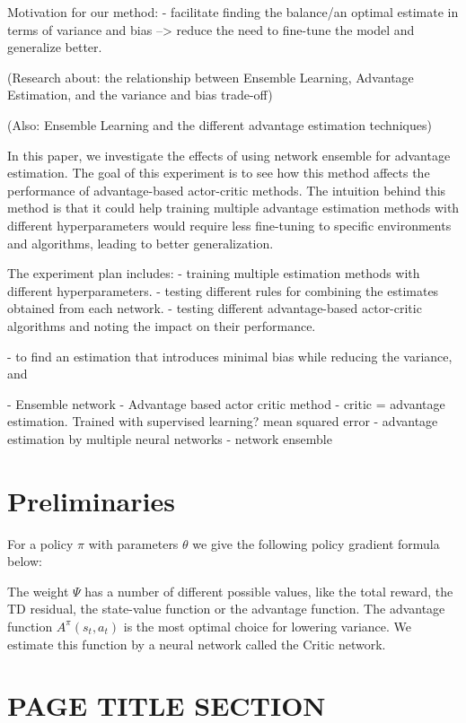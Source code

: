 \documentclass{article}
\begin{document}
Motivation for our method:
- facilitate finding the balance/an optimal estimate in terms of variance and bias --> reduce the need to fine-tune the model and generalize better.

(Research about: the relationship between Ensemble Learning, Advantage Estimation, and the variance and bias trade-off)

(Also: Ensemble Learning and the different advantage estimation techniques)

In this paper, we investigate the effects of using network ensemble for advantage estimation. The goal of this experiment is to see how this method affects the performance of advantage-based actor-critic methods. The intuition behind this method is that it could help training multiple advantage estimation methods with different hyperparameters would require less fine-tuning to specific environments and algorithms, leading to better generalization. 


The experiment plan includes:  
- training multiple estimation methods with different hyperparameters.
- testing different rules for combining the estimates obtained from each network.
- testing different advantage-based actor-critic algorithms and noting the impact on their performance. 

- to find an estimation that introduces minimal bias while reducing the variance, and 

- Ensemble network
- Advantage based actor critic method
- critic = advantage estimation. Trained with supervised learning? mean squared error
- advantage estimation by multiple neural networks
- network ensemble 


\section{Preliminaries}
\label{sec:format}

For a policy $\pi$ with parameters $\theta$ we give the following policy gradient formula below:

The weight $\Psi$ has a number of different possible values, like the total reward, the TD residual, the state-value function or the advantage function. The advantage function $A^\pi(s_t, a_t)$ is the most optimal choice for lowering variance. We estimate this function by a neural network called the Critic network.

\section{PAGE TITLE SECTION}
\label{sec:pagestyle}
\end{document}
